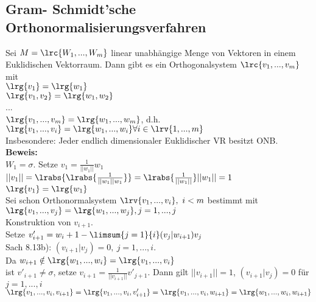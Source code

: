 \subsection{Gram- Schmidt'sche Orthonormalisierungsverfahren}
	Sei $ M=\lrc{W_1,...,W_m} $ linear unabhängige Menge von Vektoren in einem Euklidischen Vektorraum. Dann gibt es ein Orthogonalsystem $ \lrc{v_1,...,v_m} $ mit\\
	$ \lrg{v_1}=\lrg{w_1} $\\
	$ \lrg{v_1,v_2}=\lrg{w_1,w_2} $\\
	...\\
	$ \lrg{v_1,...,v_m}=\lrg{w_1,...,w_m} $, d.h.\\
	$ \lrg{v_1,...,v_i}=\lrg{w_1,...,w_i}\forall i\in\lrv{1,...,m} $\\
	Insbesondere: Jeder endlich dimensionaler Euklidischer VR besitzt ONB.\\
	\textbf{Beweis:}\\
	$ W_1=\sigma $. Setze $ v_1=\frac{1}{||w_1||}w_1 $\\
	$ ||v_1||=\lrabs{\lrabs{\frac{1}{||w_1||w_1}}}=\lrabs{\frac{1}{||w_1||}}||w_1||=1 $\\
	$ \lrg{v_1}=\lrg{w_1} $\\
	Sei schon Orthonormalsystem $ \lrv{v_1,...,v_i},\ i<m $ bestimmt mit $ \lrg{v_1,...,v_j}=\lrg{w_1,...,w_j},j=1,...,j $\\
	Konstruktion von $ v_{i+1} $.\\
	Setze $ v'_{i+1}=w_i+1-\limsum{j=1}{i}(v_j|w_{i+1})v_j $\\
	Sach 8.13b): $ (v_{i+1}|v_j)=0,\ j=1,...,i $.\\
	Da $ w_{i+1}\notin\lrg{w_1,...,w_i}=\lrg{v_1,...,v_i} $\\
	ist $ v'_{i+1}\neq\sigma $, setze $ v_{i+1}=\frac{1}{||v_{i+1}||}v'_{j+1} $. Dann gilt $ ||v_{i+1}||=1 $, $ (v_{i+1}|v_j)=0 $ für $ j=1,...,i $\\
	$ \lrg{v_1,...,v_i,v_{i+1}}=\lrg{v_1,...,v_i,v'_{i+1}}=\lrg{v_1,...,v_i,w_{i+1}}=\lrg{w_1,...,w_i,w_{i+1}} $

